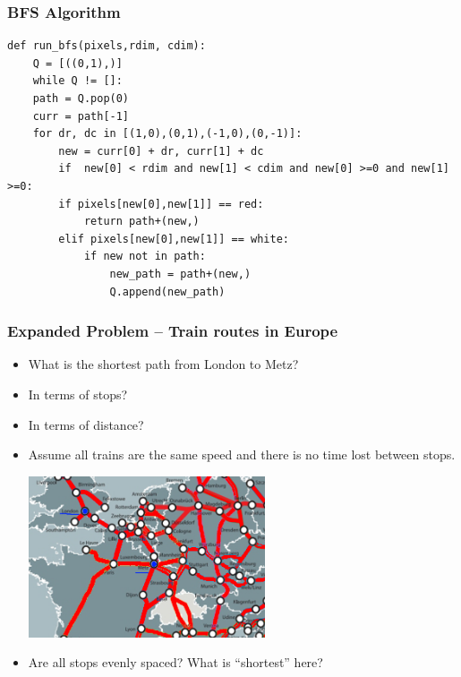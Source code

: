 \documentclass{beamer}
\begin{document}
                \begin{frame}[fragile]
                    \frametitle{BFS Algorithm}
    \begin{lstlisting}
def run_bfs(pixels,rdim, cdim):
    Q = [((0,1),)]
    while Q != []:
    path = Q.pop(0)
    curr = path[-1]
    for dr, dc in [(1,0),(0,1),(-1,0),(0,-1)]:
        new = curr[0] + dr, curr[1] + dc
        if  new[0] < rdim and new[1] < cdim and new[0] >=0 and new[1] >=0:
        if pixels[new[0],new[1]] == red:
            return path+(new,)
        elif pixels[new[0],new[1]] == white:
            if new not in path:
                new_path = path+(new,)
                Q.append(new_path)
\end{lstlisting}
    
                \end{frame}


                \begin{frame}[fragile]
                    \frametitle{Expanded Problem -- Train routes in Europe}
\begin{itemize}
    \item What is the shortest path from London to Metz?

    \item In terms of stops? 

    \item In terms of distance? 

    \item Assume all trains are the same speed and there is no time lost between stops. 

    \includegraphics[width=7cm]{figures/london_trains.png}

\item Are all stops evenly spaced? What is ``shortest'' here?
\end{itemize}

\end{frame}
\end{document}
